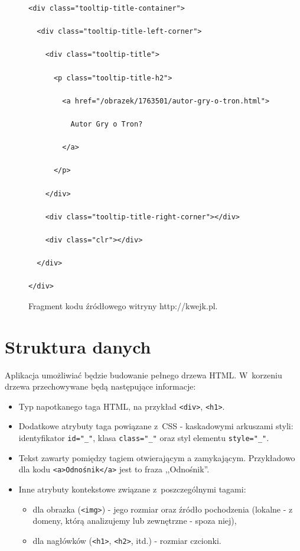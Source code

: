 \documentclass[a4paper,10pt]{article}
\begin{document}
\begin{figure}[h!]
\centering
  \begin{Verbatim}[frame=single,baselinestretch=0.3]
<div class="tooltip-title-container">

  <div class="tooltip-title-left-corner">

    <div class="tooltip-title">

      <p class="tooltip-title-h2">

        <a href="/obrazek/1763501/autor-gry-o-tron.html">

          Autor Gry o Tron?

        </a>

      </p>

    </div>

    <div class="tooltip-title-right-corner"></div>

    <div class="clr"></div>

  </div>

</div>
  \end{Verbatim}
  \caption{Fragment kodu źródłowego witryny http://kwejk.pl.}
  \label{fig:kwejk_listing}
\end{figure}


\section*{Struktura danych}

Aplikacja umożliwiać będzie budowanie pełnego drzewa HTML. W~korzeniu drzewa przechowywane będą następujące informacje:

\begin{itemize}
 \item Typ napotkanego taga HTML, na przykład \verb+<div>+, \verb+<h1>+.
 \item Dodatkowe atrybuty taga powiązane z~CSS - kaskadowymi arkuszami styli: identyfikator \verb+id="_"+, klasa \verb+class="_"+ oraz styl elementu \verb+style="_"+.
 \item Tekst zawarty pomiędzy tagiem otwierającym a zamykającym. Przykładowo dla kodu \verb+<a>Odnośnik</a>+ jest to fraza ,,Odnośnik''.
 \item Inne atrybuty kontekstowe związane z~poszczególnymi tagami:
 
    \begin{itemize}
      \item dla obrazka (\verb+<img>+) - jego rozmiar oraz źródło pochodzenia (lokalne - z domeny, którą analizujemy lub zewnętrzne - spoza niej),
      \item dla nagłówków (\verb+<h1>+, \verb+<h2>+, itd.) - rozmiar czcionki.
    \end{itemize}
\end{itemize}
\end{document}
